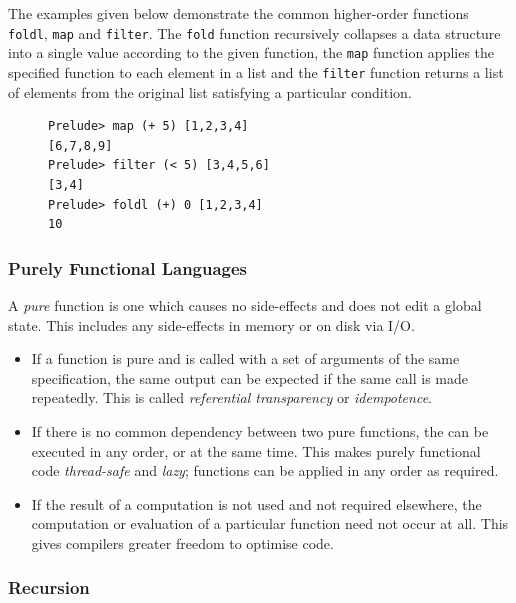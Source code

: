 \documentclass[10pt]{article}
\begin{document}
The examples given below demonstrate the common higher-order functions \texttt{foldl}, \texttt{map} and \texttt{filter}. The \texttt{fold} function recursively collapses a data structure into a single value according to the given function, the \texttt{map} function applies the specified function to each element in a list and the \texttt{filter} function returns a list of elements from the original list satisfying a particular condition.

\begin{figure}[H]
\begin{verbatim}
Prelude> map (+ 5) [1,2,3,4]
[6,7,8,9]
Prelude> filter (< 5) [3,4,5,6]
[3,4]
Prelude> foldl (+) 0 [1,2,3,4]
10
\end{verbatim}
\end{figure}

\subsubsection{Purely Functional Languages}
\label{sec:org4065731}

A \emph{pure} function is one which causes no side-effects and does not edit a global state. This includes any side-effects in memory or on disk via I/O.

\begin{itemize}
\item If a function is pure and is called with a set of arguments of the same specification, the same output can be expected if the same call is made repeatedly. This is called \emph{referential transparency} or \emph{idempotence}.

\item If there is no common dependency between two pure functions, the can be executed in any order, or at the same time. This makes purely functional code \emph{thread-safe} and \emph{lazy}; functions can be applied in any order as required.

\item If the result of a computation is not used and not required elsewhere, the computation or evaluation of a particular function need not occur at all. This gives compilers greater freedom to optimise code.
\end{itemize}

\subsubsection{Recursion}
\label{sec:org7102f58}
\end{document}
